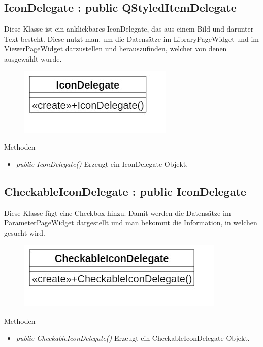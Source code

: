 \subsection*{IconDelegate : public QStyledItemDelegate}
Diese Klasse ist ein anklickbares IconDelegate, das aus einem Bild und darunter Text besteht. Diese nutzt man, um die Datensätze im LibraryPageWidget und im ViewerPageWidget darzustellen und herauszufinden, welcher von denen ausgewählt wurde.

\begin{figure}[H]
	\centering
	\includegraphics[scale=0.5]{img/Klassendiagramm/Klassen/View/IconDelegate}
	\label{fig:iconDelegate}
\end{figure}
\pagebreak
Methoden
\begin{itemize}
	\item\textit{public IconDelegate()}
	Erzeugt ein IconDelegate-Objekt.
\end{itemize}

\subsection*{CheckableIconDelegate : public IconDelegate}
Diese Klasse fügt eine Checkbox hinzu. Damit werden die Datensätze im ParameterPageWidget dargestellt und man bekommt die Information, in welchen gesucht wird.

\begin{figure}[H]
	\centering
	\includegraphics[scale=0.5]{img/Klassendiagramm/Klassen/View/CheckableIconDelegate}
	\label{fig:checkableIconDelegate}
\end{figure}

Methoden
\begin{itemize}
	\item\textit{public CheckableIconDelegate()}
	Erzeugt ein CheckableIconDelegate-Objekt.
\end{itemize} 

